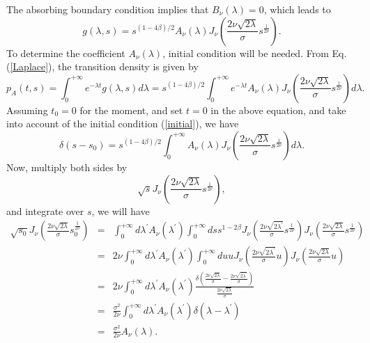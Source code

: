 \documentclass[12pt]{article}
\begin{document}
  The absorbing boundary condition implies that $B_{\nu}(\lambda)=0$, which leads to
  \begin{equation}
    g(\lambda, s)=s^{(1-4\beta)/2}A_{\nu}(\lambda)J_{\nu}\left(\frac{2\nu\sqrt{2\lambda}}{\sigma}s^{\frac{1}{2\nu}}\right).
  \end{equation}
  To determine the coefficient $A_{\nu}(\lambda)$, initial condition will be needed. From Eq. (\ref{Laplace}), the transition
  density is given by
  \begin{equation}
    p_A(t,s)=\int_0^{+\infty}e^{-\lambda t}g(\lambda,s)d\lambda
          =s^{(1-4\beta)/2}\int_0^{+\infty}e^{-\lambda t}
          A_{\nu}(\lambda)J_{\nu}\left(\frac{2\nu\sqrt{2\lambda}}{\sigma}s^{\frac{1}{2\nu}}\right)d\lambda.
  \end{equation}
  Assuming $t_0=0$ for the moment, and set $t=0$ in the above equation, and take into account of the initial condition
  (\ref{initial}), we have
  \begin{equation}
    \delta(s-s_0)=s^{(1-4\beta)/2}\int_0^{+\infty}
          A_{\nu}(\lambda)J_{\nu}\left(\frac{2\nu\sqrt{2\lambda}}{\sigma}s^{\frac{1}{2\nu}}\right)d\lambda.
  \end{equation}
  Now, multiply both sides by
  $$
    \sqrt{s}J_{\nu}\left(\frac{2\nu\sqrt{2\lambda}}{\sigma}s^{\frac{1}{2\nu}}\right),
  $$
  and integrate over $s$, we will have
  \begin{eqnarray}
      \sqrt{s_0}J_{\nu}\left(\frac{2\nu\sqrt{2\lambda}}{\sigma}s_0^{\frac{1}{2\nu}}\right)
    &=&  \int_0^{+\infty}d\lambda^{\prime} A_{\nu}(\lambda^{\prime})
         \int_0^{+\infty}ds s^{1-2\beta}
         J_{\nu}\left(\frac{2\nu\sqrt{2\lambda^{\prime}}}{\sigma}s^{\frac{1}{2\nu}}\right)
         J_{\nu}\left(\frac{2\nu\sqrt{2\lambda}}{\sigma}s^{\frac{1}{2\nu}}\right)\nonumber\\
    &=& 2\nu \int_0^{+\infty}d\lambda^{\prime} A_{\nu}(\lambda^{\prime})
         \int_0^{+\infty}du u
         J_{\nu}\left(\frac{2\nu\sqrt{2\lambda^{\prime}}}{\sigma}u\right)
         J_{\nu}\left(\frac{2\nu\sqrt{2\lambda}}{\sigma}u\right) \nonumber\\
    &=& 2\nu \int_0^{+\infty}d\lambda^{\prime} A_{\nu}(\lambda^{\prime})
          \frac{\displaystyle \delta\left(\frac{2\nu\sqrt{2\lambda}}{\sigma} - \frac{2\nu\sqrt{2\lambda^{\prime}}}{\sigma}\right)}
            {\displaystyle \frac{2\nu\sqrt{2\lambda}}{\sigma}}\nonumber\\
    &=& \frac{\sigma^2}{2\nu}\int_0^{+\infty}d\lambda^{\prime} A_{\nu}(\lambda^{\prime})
          \delta(\lambda - \lambda^{\prime})\nonumber\\
    &=& \frac{\sigma^2}{2\nu}A_{\nu}(\lambda).
  \end{eqnarray}
\end{document}
